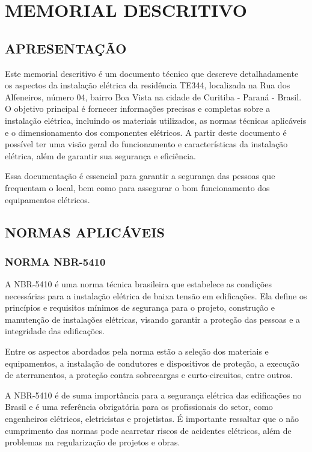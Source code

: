 \chapter[MEMORIAL DESCRITIVO]{MEMORIAL DESCRITIVO}

\section{APRESENTAÇÃO}

Este memorial descritivo é um documento técnico que descreve detalhadamente os aspectos da instalação elétrica da residência TE344, localizada na Rua dos Alfeneiros, número 04, bairro Boa Vista na cidade de Curitiba - Paraná - Brasil. O objetivo principal é fornecer informações precisas e completas sobre a instalação elétrica, incluindo os materiais utilizados, as normas técnicas aplicáveis e o dimensionamento dos componentes elétricos. A partir deste documento é possível ter uma visão geral do funcionamento e características da instalação elétrica, além de garantir sua segurança e eficiência. 

Essa documentação é essencial para garantir a segurança das pessoas que frequentam o local, bem como para assegurar o bom funcionamento dos equipamentos elétricos. 

\section{NORMAS APLICÁVEIS}

\subsection{NORMA NBR-5410}

A NBR-5410 é uma norma técnica brasileira que estabelece as condições necessárias para a instalação elétrica de baixa tensão em edificações. Ela define os princípios e requisitos mínimos de segurança para o projeto, construção e manutenção de instalações elétricas, visando garantir a proteção das pessoas e a integridade das edificações.

Entre os aspectos abordados pela norma estão a seleção dos materiais e equipamentos, a instalação de condutores e dispositivos de proteção, a execução de aterramentos, a proteção contra sobrecargas e curto-circuitos, entre outros.

A NBR-5410 é de suma importância para a segurança elétrica das edificações no Brasil e é uma referência obrigatória para os profissionais do setor, como engenheiros elétricos, eletricistas e projetistas. É importante ressaltar que o não cumprimento das normas pode acarretar riscos de acidentes elétricos, além de problemas na regularização de projetos e obras.

